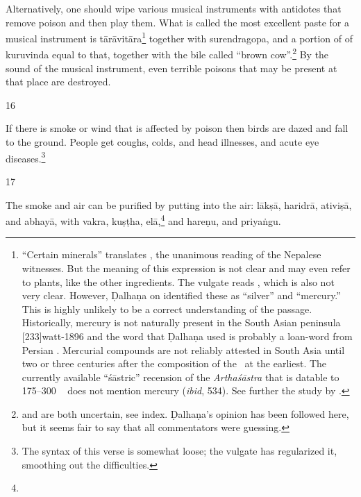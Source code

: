 \begin{translation}
Alternatively, one should wipe various musical instruments with antidotes that
remove poison and then play them.   What is called the most excellent paste for a
musical instrument is \gls{tārāvitāra}\footnote{“Certain minerals” translates
    , the unanimous reading of the Nepalese witnesses.  But the
    meaning of this expression is not clear and may even refer to plants, like the
    other ingredients.  The vulgate reads , which is also not very
    clear.  However, Ḍalhaṇa on  identified these as “silver” and
    “mercury.” This is highly unlikely to be a correct understanding of the passage. 
    Historically, mercury is not naturally present in the South Asian peninsula
    [233]{watt-1896} and the word  that Ḍalhaṇa used is
    probably a loan-word from Persian \citep[sub \emph{paranda,
    parranda}][244b]{stei-pers}.  Mercurial compounds are not reliably attested in
    South Asia until two or three centuries after the composition of the \SS\ at the
    earliest.  The currently available “śāstric” recension of the \emph{Arthaśāstra}
    that is datable to 175--300 \CE\ \citep[29--31]{oliv-2013} does not mention
    mercury (\emph{ibid}, 534).  See further the study by \citet[17, \emph{et
    passim}]{wuja-2013b}.} together with \gls{surendragopa}, and a portion of of
    \gls{kuruvinda} equal to that, together with the bile called “brown
    cow”.\footnote{ and  are both uncertain, see
        index. Ḍalhaṇa's opinion has been followed here, but it seems fair to say that all
        commentators were guessing.} By the sound of the musical instrument, even 
        terrible
        poisons that may be present at that place are destroyed.
        
\item[16]

If there is smoke or wind that is affected by poison then birds are dazed and fall
to the ground.  People get coughs, colds, and head illnesses, and acute eye
diseases.\footnote{The syntax of this verse is somewhat loose; the vulgate has
    regularized it, smoothing out the difficulties.}

\item[17]

The smoke and air can be purified by putting into the air: 
\gls{lākṣā},
\gls{haridrā},
\gls{ativiṣā},
and
\gls{abhayā},
with
\gls{vakra},
\gls{kuṣṭha},
\gls{elā},\footnote{}
and
\gls{hareṇu},
and
\gls{priyaṅgu}.

\end{translation}

